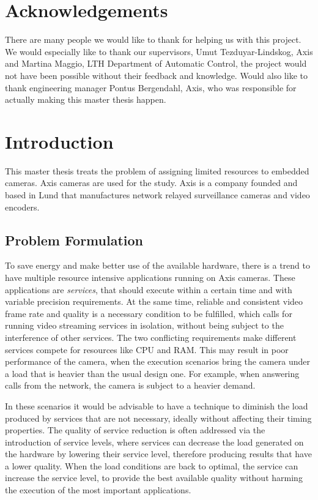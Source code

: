 \documentclass[nobiblatex]{LTHthesis}
\begin{document}
\chapter*{Acknowledgements}

There are many people we would like to thank for helping us with this project. We would especially like to thank our supervisors, Umut Tezduyar-Lindskog, Axis and Martina Maggio, LTH Department of Automatic Control, the project would not have been possible without their feedback and knowledge. Would also like to thank engineering manager Pontus Bergendahl, Axis, who was responsible for actually making this master thesis happen.


\tableofcontents
\newpage

\setcounter{page}{1}

\chapter{Introduction}

This master thesis treats the problem of assigning limited resources to
embedded cameras. Axis cameras are used for the study. Axis is a company
founded and based in Lund that manufactures network relayed surveillance
cameras and video encoders.

\section{Problem Formulation}

To save energy and make better use of the available hardware, there is a
trend to have multiple resource intensive applications running on Axis
cameras. These applications are \emph{services}, that should execute within
a certain time and with variable precision requirements. At the same time,
reliable and consistent video frame rate and quality is a necessary
condition to be fulfilled, which calls for running video streaming
services in isolation, without being subject to the interference of
other services. The two conflicting requirements make different services 
compete for resources like CPU and RAM. This may result in poor performance 
of the camera, when the execution scenarios bring the camera under a load
that is heavier than the usual design one. For example, when answering calls
from the network, the camera is subject to a heavier demand. 

In these scenarios it would be advisable to have a technique to diminish
the load produced by services that are not necessary, ideally without
affecting their timing properties. The quality of service reduction is
often addressed via the introduction of service levels, where services can
decrease the load generated on the hardware by lowering their service level,
therefore producing results that have a lower quality. When the load
conditions are back to optimal, the service can increase the service level,
to provide the best available quality without harming the execution of the
most important applications.
\end{document}
